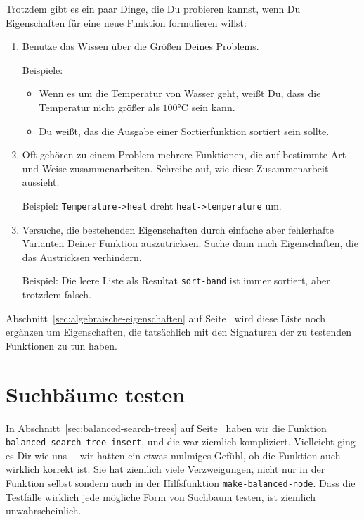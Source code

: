 Trotzdem gibt es ein paar Dinge, die Du probieren kannst, wenn Du
Eigenschaften für eine neue Funktion formulieren willst:
%
\begin{enumerate}
\item Benutze das Wissen über die Größen Deines Problems.

  Beispiele:

  \begin{itemize}
    \item Wenn es um die Temperatur von Wasser geht, weißt Du,
    dass die Temperatur nicht größer als $100$\si{\degree}C sein kann.
  \item Du weißt, das
    die Ausgabe einer Sortierfunktion sortiert sein sollte.
  \end{itemize}
\item Oft gehören zu einem Problem mehrere Funktionen, die auf
  bestimmte Art und Weise zusammenarbeiten.  Schreibe auf, wie diese
  Zusammenarbeit aussieht.

  Beispiel: \lstinline{Temperature->heat} dreht
  \lstinline{heat->temperature} um.
\item Versuche, die bestehenden Eigenschaften durch einfache aber
  fehlerhafte Varianten Deiner Funktion auszutricksen.
  Suche dann nach
  Eigenschaften, die das Austricksen verhindern.

  Beispiel: Die leere Liste als Resultat \lstinline{sort-band} ist
  immer sortiert, aber trotzdem falsch.
\end{enumerate}
%
Abschnitt~\ref{sec:algebraische-eigenschaften} auf
Seite~\pageref{sec:algebraische-eigenschaften} wird diese Liste noch
ergänzen um Eigenschaften, die tatsächlich mit den Signaturen der zu
testenden Funktionen zu tun haben.

\section{Suchbäume testen}
\label{sec:suchbaeume-testen}

%
In Abschnitt~\ref{sec:balanced-search-trees} auf
Seite~\pageref{sec:balanced-search-trees} haben wir die Funktion
\lstinline{balanced-search-tree-insert}, und die war ziemlich
kompliziert.  Vielleicht ging es Dir wie uns~-- wir hatten ein etwas
mulmiges Gefühl, ob die Funktion auch wirklich korrekt ist.
Sie hat ziemlich viele Verzweigungen, nicht nur in der Funktion selbst
sondern auch in der Hilfsfunktion \lstinline{make-balanced-node}.
Dass die Testfälle wirklich jede mögliche Form von Suchbaum testen,
ist ziemlich unwahrscheinlich.

